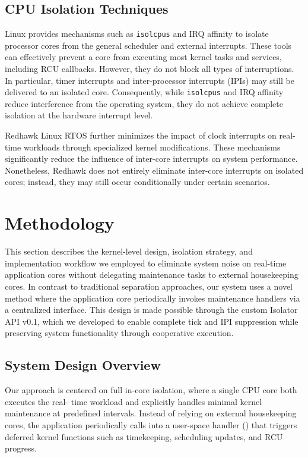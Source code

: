 \documentclass[letterpaper]{article}
\begin{document}
\subsection{CPU Isolation Techniques}

Linux provides mechanisms such as \texttt{isolcpus} and IRQ affinity \cite{KernelDocParam} 
to isolate processor cores from the general scheduler and external interrupts. 
These tools can effectively prevent a core from executing most kernel tasks and services, 
including RCU callbacks. However, they do not block all types of interruptions. 
In particular, timer interrupts and inter-processor interrupts (IPIs) may still be delivered 
to an isolated core. Consequently, while \texttt{isolcpus} and IRQ affinity reduce interference 
from the operating system, they do not achieve complete isolation at the hardware interrupt level.  

Redhawk Linux RTOS \cite{redhawk} further minimizes the impact of clock interrupts on real-time workloads 
through specialized kernel modifications. These mechanisms significantly reduce the influence 
of inter-core interrupts on system performance. Nonetheless, Redhawk does not entirely eliminate 
inter-core interrupts on isolated cores; instead, they may still occur conditionally under certain scenarios.


\section{Methodology}\label{BE}

This section describes the kernel-level design, isolation strategy, and implementation workflow we
employed to eliminate system noise on real-time application cores without delegating
maintenance tasks to external housekeeping cores. In contrast to traditional separation
approaches, our system uses a novel method where the application core periodically invokes
maintenance handlers via a centralized interface. This design is made possible through the custom
Isolator API v0.1, which we developed to enable complete tick and IPI suppression while
preserving system functionality through cooperative execution.


\subsection{System Design Overview}

Our approach is centered on full in-core isolation, where a single CPU core both executes the real-
time workload and explicitly handles minimal kernel maintenance at predefined intervals. Instead
of relying on external housekeeping cores, the application periodically calls into a user-space
handler () that triggers deferred kernel functions such as timekeeping, scheduling updates, and
RCU progress.
\end{document}
